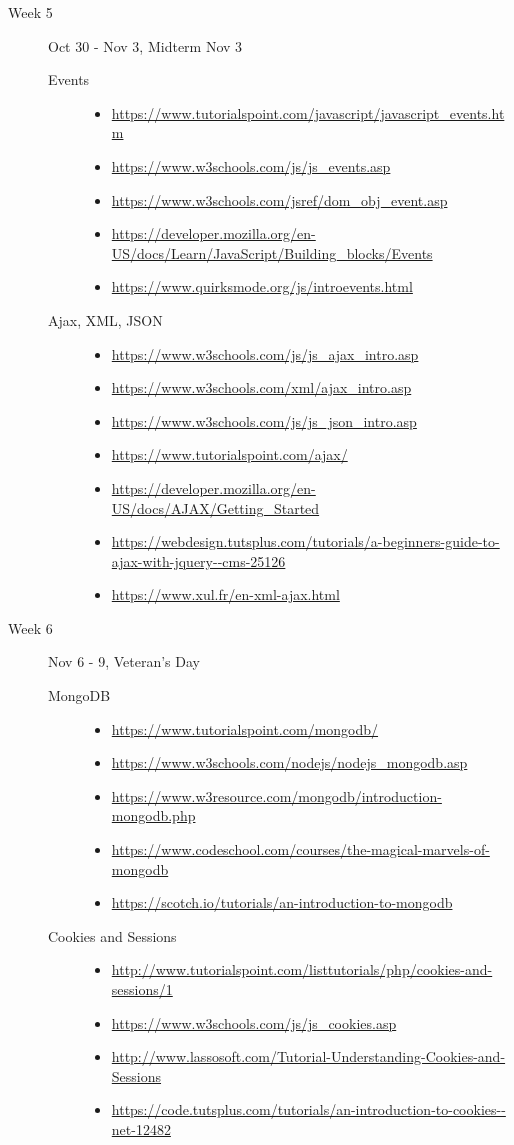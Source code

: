 \documentclass{article}
\newcommand{\myitem}[1]{\item{\scriptsize\url{#1}}}
\begin{document}
\begin{description}
\begin{description}
\end{description}
\item[Week 5] Oct 30 - Nov 3,  Midterm Nov 3
  \begin{description}


\item[Events]\mbox{}
  \begin{itemize}
  \myitem{https://www.tutorialspoint.com/javascript/javascript_events.htm}
  \myitem{https://www.w3schools.com/js/js_events.asp}
  \myitem{https://www.w3schools.com/jsref/dom_obj_event.asp}
  \myitem{https://developer.mozilla.org/en-US/docs/Learn/JavaScript/Building_blocks/Events}
  \myitem{https://www.quirksmode.org/js/introevents.html}
  \end{itemize}    

\item[Ajax, XML, JSON]\mbox{}
  \begin{itemize}
  \myitem{https://www.w3schools.com/js/js_ajax_intro.asp}
  \myitem{https://www.w3schools.com/xml/ajax_intro.asp}
  \myitem{https://www.w3schools.com/js/js_json_intro.asp}
  \myitem{https://www.tutorialspoint.com/ajax/}
  \myitem{https://developer.mozilla.org/en-US/docs/AJAX/Getting_Started}
  \myitem{https://webdesign.tutsplus.com/tutorials/a-beginners-guide-to-ajax-with-jquery--cms-25126}
  \myitem{https://www.xul.fr/en-xml-ajax.html}
  \end{itemize}

  \end{description}
\item[Week 6]  Nov 6 - 9, Veteran's Day
  \begin{description}

\item[MongoDB]\mbox{}
  \begin{itemize}
  \myitem{https://www.tutorialspoint.com/mongodb/}
  \myitem{https://www.w3schools.com/nodejs/nodejs_mongodb.asp}
  \myitem{https://www.w3resource.com/mongodb/introduction-mongodb.php}
  \myitem{https://www.codeschool.com/courses/the-magical-marvels-of-mongodb}
  \myitem{https://scotch.io/tutorials/an-introduction-to-mongodb}
  \end{itemize}

\item[Cookies and Sessions]\mbox{}
  \begin{itemize}
  \myitem{http://www.tutorialspoint.com/listtutorials/php/cookies-and-sessions/1}
  \myitem{https://www.w3schools.com/js/js_cookies.asp}
  \myitem{http://www.lassosoft.com/Tutorial-Understanding-Cookies-and-Sessions}
  \myitem{https://code.tutsplus.com/tutorials/an-introduction-to-cookies--net-12482}
  \end{itemize}
  


\end{description}
\end{description}
\end{document}
